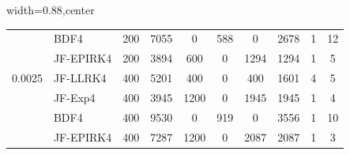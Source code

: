 \begin{table}[htb]
\begin{adjustbox}{width=0.88\columnwidth,center}
\begin{tabular}{cccccccccc}
			\multicolumn{1}{l}{} & \multicolumn{1}{l}{BDF4} & 200 & 7055 & 0 & 588 & 0 &
			2678 & 1 & 12 \\
			\multicolumn{1}{l}{} & \multicolumn{1}{l}{JF-EPIRK4} & 200 & 3894 & 600 & 0 &
			1294 & 1294 & 1 & 5 \\
			\multicolumn{1}{l}{0.0025} & \multicolumn{1}{l}{JF-LLRK4} & 400 & 5201 & 400
			& 0 & 400 & 1601 & 4 & 5 \\
			\multicolumn{1}{l}{} & \multicolumn{1}{l}{JF-Exp4} & 400 & 3945 & 1200 & 0 &
			1945 & 1945 & 1 & 4 \\
			\multicolumn{1}{l}{} & \multicolumn{1}{l}{BDF4} & 400 & 9530 & 0 & 919 & 0 &
			3556 & 1 & 10 \\
			\multicolumn{1}{l}{} & \multicolumn{1}{l}{JF-EPIRK4} & 400 & 7287 & 1200 & 0 &
			2087 & 2087 & 1 & 3 \\
			\hline
		\end{tabular}
	\end{adjustbox}
	\label{tab:br}
\end{table}

